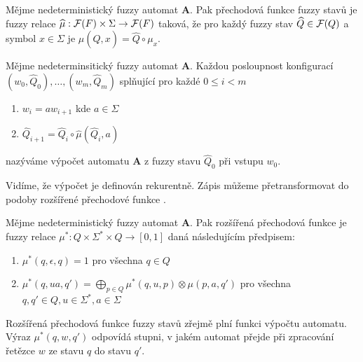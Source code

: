 \documentclass[a4paper,10pt]{article}
\begin{document}
\begin{definition}\label{def-PreFunFuzzStav}
 Mějme nedeterministický fuzzy automat $\mathbf{A}$. Pak přechodová funkce fuzzy stavů je fuzzy relace $\widehat{\mu}: \mathcal{F}(F) \times \Sigma \rightarrow \mathcal{F}(F)$ taková, že pro každý fuzzy stav $\widehat{Q} \in \mathcal{F}(Q)$ a symbol $x \in \Sigma$ je $\widehat{\mu}(\widehat{Q}, x) = \widehat{Q} \circ \mu_x$.
\end{definition}

\begin{definition}
  Mějme nedeterminsitický fuzzy automat $\mathbf{A}$. Každou posloupnost konfigurací $(w_0, \widehat{Q}_0), \dots, (w_m, \widehat{Q}_m)$ splňující pro každé $0 \leq i < m$
  \begin{enumerate}
   \item $w_{i} = a w_{i+1}$ kde $a \in \Sigma$
   \item $\widehat{Q}_{i+1} = \widehat{Q}_{i} \circ \widehat{\mu}(\widehat{Q}_{i}, a)$
  \end{enumerate}
  nazýváme výpočet automatu $\mathbf{A}$ z fuzzy stavu $\widehat{Q}_0$ při vstupu $w_0$.
\end{definition}

Vidíme, že výpočet je definován rekurentně. Zápis můžeme přetransformovat do podoby rozšířené přechodové funkce \cite{IgnCirBog-DetFuzAutMemValComResLat}.

\begin{definition}\label{def-RozPreFunFuzzStav}
 Mějme nedeterministický fuzzy automat $\mathbf{A}$. Pak rozšířená přechodová funkce je fuzzy relace $\mu^*: Q \times \Sigma^* \times Q \rightarrow [0,1]$ daná následujícím předpisem:
 
 \begin{enumerate}
  \item $\mu^*(q, \epsilon, q) = 1$ pro všechna $q \in Q$
  \item $\mu^*(q, u a, q') =  \bigoplus_{p \in Q} \mu^*(q, u, p) \otimes \mu(p, a, q')$ pro všechna $q, q' \in Q, u \in \Sigma^*, a \in \Sigma$
 \end{enumerate}
\end{definition}

Rozšířená přechodová funkce fuzzy stavů zřejmě plní funkci výpočtu automatu. Výraz $\mu^*(q, w, q')$ odpovídá stupni, v jakém automat přejde při zpracování řetězce $w$ ze stavu $q$ do stavu $q'$. 
\end{document}

